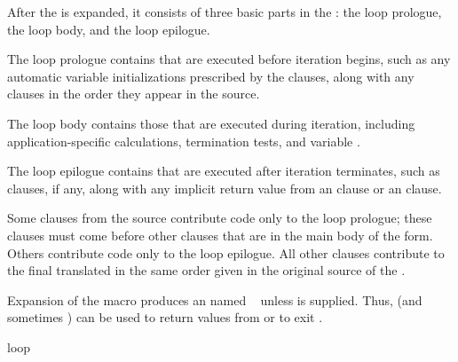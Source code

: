 After the  is expanded, it consists of three basic parts in the 
: 
      the loop prologue,
      the loop body,
  and the loop epilogue.

\beginlist
{}
 
The loop prologue contains  
that are executed before iteration begins, such as
any automatic variable initializations prescribed 
by the  clauses, along with any  clauses
in the order they appear in the source.
 
 
The loop body contains those  that are executed during iteration, 
including application-specific calculations, termination tests,
and variable .
                           
 
The loop epilogue contains  that are executed after iteration 
terminates, such as  clauses, if any, along
with any implicit return value from an  clause or
an  clause.

\endlist
 
Some clauses from the source 
contribute code only to the loop prologue; these clauses must
  come before other clauses that are in the main body of the  form.            
  Others contribute code only to the loop epilogue.
  All other clauses contribute to the final 
translated  in the same 
  order given in the original source  of the .

Expansion of the  macro produces an  named \nil\ 
unless  is supplied.
Thus,  (and sometimes )
can be used to return values from  or to exit .

\endsubsubsection%


\Defmac loop { 
	      }

